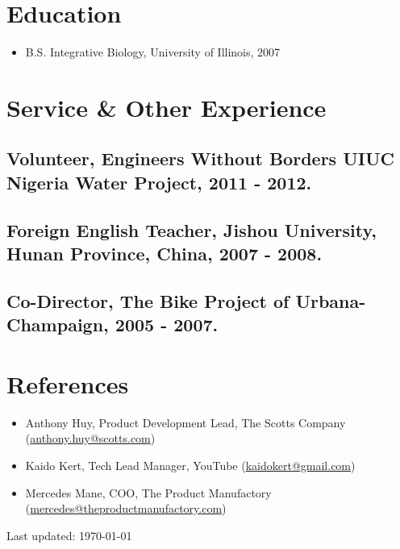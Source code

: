 \documentclass[letterpaper]{article}
\def\footerlink{}
\begin{document}
\section*{Education}

  \begin{itemize}
    \item B.S. Integrative Biology, University of Illinois, 2007
  \end{itemize}

\section*{Service \& Other Experience}

  \subsection*{Volunteer, Engineers Without Borders UIUC Nigeria Water Project, 2011 - 2012.}

  \subsection*{Foreign English Teacher, Jishou University, Hunan Province, China, 2007 - 2008.}

  \subsection*{Co-Director, The Bike Project of Urbana-Champaign, 2005 - 2007.}

\section*{References}

\begin{itemize}
  \item Anthony Huy, Product Development Lead, The Scotts Company (\href{mailto:anthony.huy@scotts.com}{anthony.huy@scotts.com})
  \item Kaido Kert, Tech Lead Manager, YouTube (\href{mailto:kaidokert@gmail.com}{kaidokert@gmail.com})
  \item Mercedes Mane, COO, The Product Manufactory (\href{mailto:mercedes@theproductmanufactory.com}{mercedes@theproductmanufactory.com})
\end{itemize}

\bigskip

\begin{center}
  \begin{footnotesize}
    Last updated: \today \\
    \href{\footerlink}{\texttt{\footerlink}}
  \end{footnotesize}
\end{center}
\end{document}
